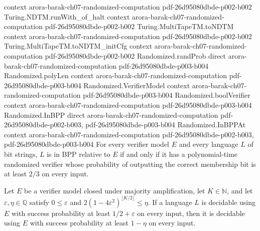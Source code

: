 \begin{theorem}
  {context}
  {arora-barak-ch07-randomized-computation}
  {pdf-26d95080dbde-p002-b002}
\proofstep
  {Turing.NDTM.runWith_of_halt}
  {context}
  {arora-barak-ch07-randomized-computation}
  {pdf-26d95080dbde-p002-b002}
\proofstep
  {Turing.MultiTapeTM.toNDTM}
  {context}
  {arora-barak-ch07-randomized-computation}
  {pdf-26d95080dbde-p002-b002}
\proofstep
  {Turing.MultiTapeTM.toNDTM_initCfg}
  {context}
  {arora-barak-ch07-randomized-computation}
  {pdf-26d95080dbde-p002-b002}
\proofstep
  {Randomized.randProb}
  {direct}
  {arora-barak-ch07-randomized-computation}
  {pdf-26d95080dbde-p003-b004}
\proofstep
  {Randomized.polyLen}
  {context}
  {arora-barak-ch07-randomized-computation}
  {pdf-26d95080dbde-p003-b004}
\proofstep
  {Randomized.VerifierModel}
  {context}
  {arora-barak-ch07-randomized-computation}
  {pdf-26d95080dbde-p003-b004}
\proofstep
  {Randomized.boolVerifier}
  {context}
  {arora-barak-ch07-randomized-computation}
  {pdf-26d95080dbde-p003-b004}
\proofstep
  {Randomized.InBPP}
  {direct}
  {arora-barak-ch07-randomized-computation}
  {pdf-26d95080dbde-p002-b003,
    pdf-26d95080dbde-p003-b004}
\proofstep
  {Randomized.InBPPAt}
  {context}
  {arora-barak-ch07-randomized-computation}
  {pdf-26d95080dbde-p002-b003,
    pdf-26d95080dbde-p003-b004}
For every verifier model $E$ and every language $L$ of bit strings, $L$ is in BPP
relative to $E$ if and only if it has a polynomial-time randomized verifier whose
probability of outputting the correct membership bit is at least $2/3$ on every input.
\end{theorem}

\begin{theorem}
\label{Randomized.InBPPAt.amplify}
\leanok
{}
Let $E$ be a verifier model closed under majority amplification, let $K\in\mathbb{N}$,
and let $\varepsilon,\eta\in\mathbb{Q}$ satisfy $0\le\varepsilon$ and
$2(1-4\varepsilon^2)^{\lfloor K/2\rfloor}\le\eta$. If a language $L$ is decidable using
$E$ with success probability at least $1/2+\varepsilon$ on every input, then it is
decidable using $E$ with success probability at least $1-\eta$ on every input.
\end{theorem}

